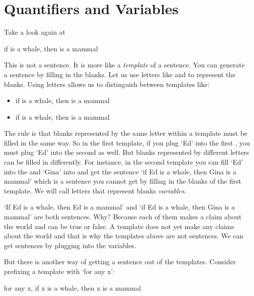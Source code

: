 \section{Quantifiers and Variables}

Take a look again at 

\begin{center}

 if \blank is a whale, then \blank is a mammal

\end{center}


This is not a sentence. It is more like a \emph{template} of a sentence. You can 
generate a sentence by filling in the blanks. Let us use letters like  and 
 to represent the blanks. Using letters allows us to distinguish between 
templates like: 

 \begin{itemize}
  \item if  is a whale, then  is a mammal
  \item if  is a whale, then  is a mammal
 \end{itemize}

The rule is that blanks represented by the same letter within a template must be 
filled in the same way. So in the first template, if you plug `Ed' into the 
first , you must plug `Ed' into the second as well. But blanks represented 
by different letters can be filled in differently. For instance, in the second 
template you can fill `Ed' into the  and `Gina' into  and get the 
sentence `if Ed is a whale, then Gina is a mammal' which is a sentence you 
cannot get by filling in the blanks of the first template. We will call letters 
that represent blanks \emph{variables}.

`If Ed is a whale, then Ed is a mammal' and `if Ed is a whale, then Gina is a 
mammal' are both sentences. Why? Because each of them makes a claim about the 
world and can be true or false. A template does not yet make any claims about 
the world and that is why the templates above are not sentences. We can get 
sentences by plugging into the variables.

But there is another way of getting a sentence out of the templates. Consider  
prefixing a template with `for any x':
\begin{center}

 for any x, if x is a whale, then x is a mammal

\end{center}


